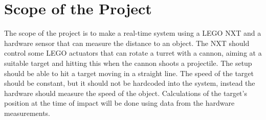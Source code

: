 \section{Scope of the Project}
The scope of the project is to make a real-time system using a LEGO NXT and a hardware sensor that can measure the distance to an object. The NXT should control some LEGO actuators that can rotate a turret with a cannon, aiming at a suitable target and hitting this when the cannon shoots a projectile. The setup should be able to hit a target moving in a straight line. The speed of the target should be constant, but it should not be hardcoded into the system, instead the hardware should measure the speed of the object. Calculations of the target's position at the time of impact will be done using data from the hardware measurements.